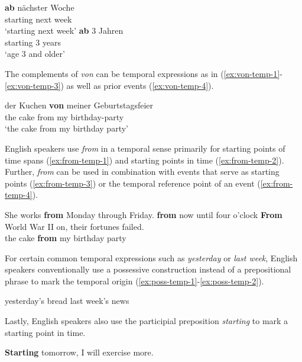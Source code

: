 \documentclass[lucida]{sp} %
\begin{document}
\begin{exe}
\ex \label{ex:ab-temp-1} \gll \textbf{ab} nächster Woche \\
starting next week \\
`starting next week'
\ex \label{ex:ab-temp-2} \gll \textbf{ab} 3 Jahren \\
starting 3 years \\
`age 3 and older'
\end{exe}
The complements of \textit{von} can be temporal expressions as in (\ref{ex:von-temp-1}-\ref{ex:von-temp-3}) as well as prior events (\ref{ex:von-temp-4}).
\begin{exe}
\ex \label{ex:von-temp-4} \gll der Kuchen \textbf{von} meiner Geburtstagsfeier \\
the cake from my birthday-party \\
`the cake from my birthday party'
\end{exe}
English speakers use \textit{from} in a temporal sense primarily for starting points of time spans (\ref{ex:from-temp-1})  and starting points in time (\ref{ex:from-temp-2}). Further, \textit{from} can be used in combination with events that serve as starting points (\ref{ex:from-temp-3}) or the temporal reference point of an event (\ref{ex:from-temp-4}). 

\begin{exe}
\ex \label{ex:from-temp-1} She works \textbf{from}  Monday through Friday.
\ex \label{ex:from-temp-2} \textbf{from} now until four o'clock \hfill \citep{clark1989a}
\ex \label{ex:from-temp-3} \textbf{From} World War II on, their fortunes failed. \\\null \hfill \citep{clark1989a}
\ex \label{ex:from-temp-4} the cake \textbf{from} my birthday party
\end{exe}
For certain common temporal expressions such as \textit{yesterday} or \textit{last week}, English speakers conventionally use a possessive construction instead of a prepositional phrase to mark the temporal origin (\ref{ex:poss-temp-1}-\ref{ex:poss-temp-2}).
\begin{exe}
\ex \label{ex:poss-temp-1} yesterday's bread
\ex \label{ex:poss-temp-2} last week's news
\end{exe}
Lastly, English speakers also use the participial preposition \textit{starting} to mark a starting point in time.
\begin{exe}
\ex \label{ex:starting-temp-1} \textbf{Starting} tomorrow, I will exercise more.
\end{exe}
\end{document}
